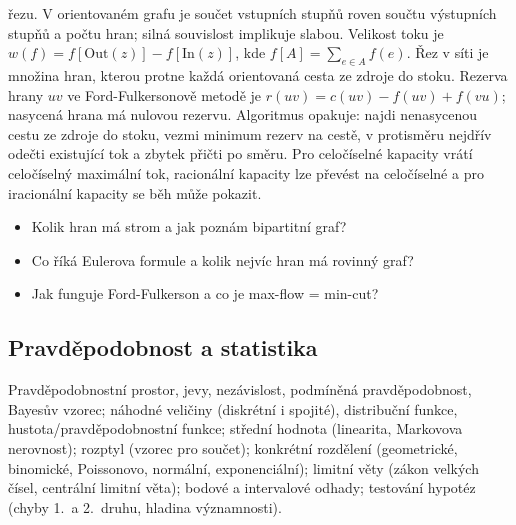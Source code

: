 \begin{odpoved}
řezu. V orientovaném grafu je součet vstupních stupňů roven součtu výstupních stupňů a
počtu hran; silná souvislost implikuje slabou. Velikost toku je
$w(f)=f[\mathrm{Out}(z)]-f[\mathrm{In}(z)]$, kde $f[A]=\sum_{e\in A}f(e)$. Řez v síti
je množina hran, kterou protne každá orientovaná cesta ze zdroje do stoku. Rezerva hrany
$uv$ ve Ford-Fulkersonově metodě je $r(uv)=c(uv)-f(uv)+f(vu)$; nasycená hrana má nulovou
rezervu. Algoritmus opakuje: najdi nenasycenou cestu ze zdroje do stoku, vezmi minimum
rezerv na cestě, v protisměru nejdřív odečti existující tok a zbytek přičti po směru.
Pro celočíselné kapacity vrátí celočíselný maximální tok, racionální kapacity lze převést
na celočíselné a pro iracionální kapacity se běh může pokazit.
\end{odpoved}
\begin{recall}
\begin{itemize}[leftmargin=1.2em,itemsep=0pt,topsep=1pt]
  \item Kolik hran má strom a jak poznám bipartitní graf?
  \item Co říká Eulerova formule a kolik nejvíc hran má rovinný graf?
  \item Jak funguje Ford-Fulkerson a co je max-flow = min-cut?
\end{itemize}
\end{recall}

\subsection{Pravděpodobnost a statistika}

\begin{tema}
Pravděpodobnostní prostor, jevy, nezávislost, podmíněná pravděpodobnost, Bayesův vzorec;
náhodné veličiny (diskrétní i spojité), distribuční funkce, hustota/pravděpodobnostní funkce;
střední hodnota (linearita, Markovova nerovnost); rozptyl (vzorec pro součet); konkrétní
rozdělení (geometrické, binomické, Poissonovo, normální, exponenciální); limitní věty (zákon
velkých čísel, centrální limitní věta); bodové a intervalové odhady; testování hypotéz (chyby
1.\ a 2.\ druhu, hladina významnosti).
\end{tema}
\begin{vezkratce}
\end{vezkratce}

